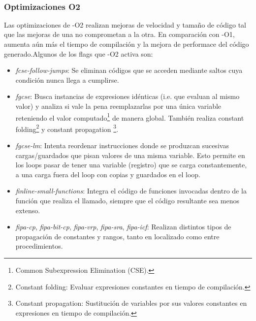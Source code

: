 ~\\



\subsubsection{Optimizaciones O2}

Las optimizaciones de -O2 realizan mejoras de velocidad y tamaño de código tal que las mejoras de una no comprometan a la otra. En comparación con -O1, aumenta aún más el tiempo de compilación y la mejora de performace del código generado.Algunos de los flags que -O2 activa son:

\begin{itemize}
	\item \textit{fcse-follow-jumps}: Se eliminan códigos que se acceden mediante saltos cuya condición nunca llega a cumplirse.

	\item \textit{fgcse}: Busca instancias de expresiones idénticas (i.e. que evaluan al mismo valor) y analiza si vale la pena reemplazarlas por una única variable reteniendo el valor computado\footnote{Common Subexpression Elimination (CSE).} de manera global. También realiza constant folding\footnote{Constant folding: Evaluar expresiones constantes en tiempo de compilación.} y constant propagation \footnote{Constant propagation: Sustitución de variables por sus valores constantes en expresiones en tiempo de compilación.}.
	
  \item \textit{fgcse-lm}: Intenta reordenar instrucciones donde se produzcan sucesivas cargas/guardados que pisan valores de una misma variable. Esto permite en los loops pasar de tener una variable (registro) que se carga constantemente, a una carga fuera del loop con copias y guardados en el loop.
	
	\item \textit{finline-small-functions}: Integra el código de funciones invocadas dentro de la función que realiza el llamado, siempre que el código resultante sea menos extenso.

	\item \textit{fipa-cp}, \textit{fipa-bit-cp}, \textit{fipa-vrp}, \textit{fipa-sra}, \textit{fipa-icf}: Realizan distintos tipos de propagación de constantes y rangos, tanto en localizado como entre procedimientos.


\end{itemize}
